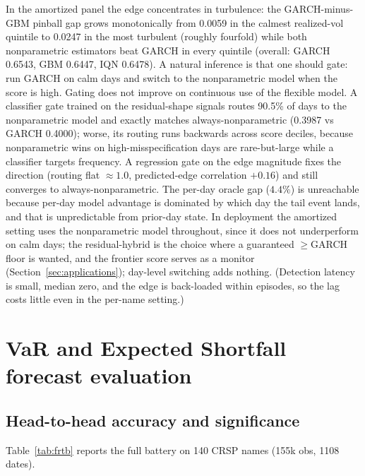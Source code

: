\documentclass[11pt]{article}
\theoremstyle{remark}
\begin{document}
In the amortized panel the edge concentrates in turbulence: the
GARCH-minus-GBM pinball gap grows monotonically from 0.0059 in the
calmest realized-vol quintile to 0.0247 in the most turbulent (roughly
fourfold) while both nonparametric estimators beat GARCH in
every quintile (overall: GARCH 0.6543, GBM 0.6447, IQN 0.6478).
A natural inference is that one should gate: run GARCH on calm
days and switch to the nonparametric model when the score is high. Gating
does not improve on continuous use of the flexible model. A classifier
gate trained on the residual-shape
 signals routes 90.5\% of days to the nonparametric model and exactly
matches always-nonparametric (0.3987 vs GARCH 0.4000); worse, its
routing runs backwards across score deciles, because nonparametric
wins on high-misspecification days are rare-but-large while a classifier targets
frequency. A regression gate on the edge magnitude fixes the direction
(routing flat $\approx 1.0$, predicted-edge correlation $+0.16$) and
still converges to always-nonparametric. The per-day oracle gap
($4.4\%$) is unreachable because per-day model advantage is dominated by
which day the tail event lands, and that is unpredictable from
prior-day state. In deployment the amortized setting uses the
nonparametric model throughout, since it does not underperform on calm
days; the residual-hybrid is the choice where a guaranteed $\ge$GARCH
floor is wanted, and the frontier score serves as a monitor
(Section~\ref{sec:applications}); day-level switching adds nothing. (Detection latency is small, median zero, and the edge is back-loaded
within episodes, so the lag costs little even in the per-name
setting.)

\section{VaR and Expected Shortfall forecast evaluation}\label{sec:frtb}

\subsection{Head-to-head accuracy and significance}

Table~\ref{tab:frtb} reports the full battery on 140 CRSP names
(155k obs, 1108 dates).
\end{document}
